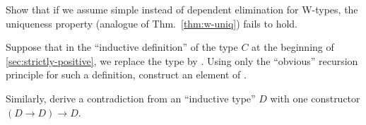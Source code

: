 \begin{ex}
  Show that if we assume simple instead of dependent elimination for W-types, the uniqueness property (analogue of Thm.~\ref{thm:w-uniq}) fails to hold.
\end{ex}

\begin{ex}\label{ex:loop}
  Suppose that in the ``inductive definition'' of the type $C$ at the beginning of \autoref{sec:strictly-positive}, we replace the type \nat by \emptyt.
  Using only the ``obvious'' recursion principle for such a definition, construct an element of \emptyt.
\end{ex}

\begin{ex}\label{ex:loop2}
  Similarly, derive a contradiction from an ``inductive type'' $D$ with one constructor $(D\to D) \to D$.
\end{ex}


